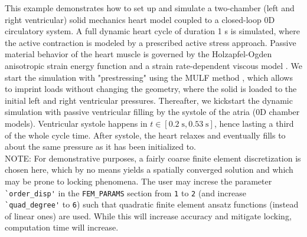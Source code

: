 \documentclass[a4paper,12pt]{report}
\begin{document}
This example demonstrates how to set up and simulate a two-chamber (left and right ventricular) solid mechanics heart model coupled to a closed-loop
0D circulatory system. A full dynamic heart cycle of duration 1 s is simulated, where the active contraction is modeled by a prescribed active stress approach.
Passive material behavior of the heart muscle is governed by the Holzapfel-Ogden anisotropic strain energy function \cite{holzapfel2009} and a strain rate-dependent viscous model \cite{chapelle2012}.
We start the simulation with "prestressing" using the MULF method \cite{gee2010,schein2021}, which allows to imprint loads without changing the geometry,
where the solid is loaded to the initial left and right ventricular pressures.
Thereafter, we kickstart the dynamic simulation with passive ventricular filling by the systole of the atria (0D chamber models). Ventricular systole
happens in $t \in [0.2\;\mathrm{s}, 0.53\;\mathrm{s}]$, hence lasting a third of the whole cycle time. After systole, the heart relaxes and eventually fills to about the same pressure
as it has been initialized to.\\

NOTE: For demonstrative purposes, a fairly coarse finite element discretization is chosen here, which by no means yields a spatially converged solution and which
may be prone to locking phenomena. The user may increse the parameter \verb"`order_disp'" in the \verb"FEM_PARAMS" section from \verb"1" to \verb"2" (and increase \verb"`quad_degree'" to \verb"6") such that quadratic finite element ansatz functions (instead of linear ones) are used. While this will increase accuracy and mitigate locking, computation time will
increase.
\end{document}
